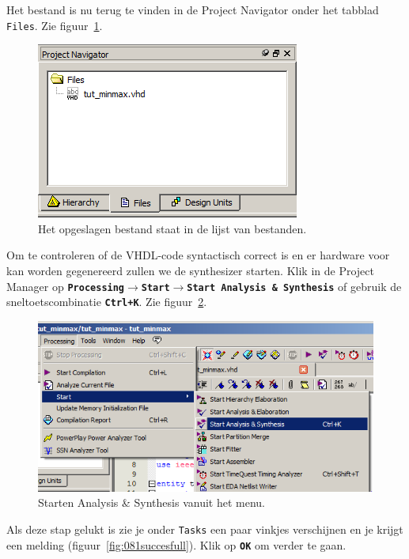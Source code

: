 \documentclass[a4paper,12pt,fleqn,twoside]{book}
\def\tutpicscale{0.455}
\newcommand{\menu}[1]{\texttt{\textbf{#1}}}
\newcommand{\knop}[1]{\texttt{\textbf{#1}}}
\newcommand{\naam}[1]{\texttt{#1}}
\def\pijl{$\rightarrow$}%
\begin{document}
Het bestand is nu terug te vinden in de Project Navigator onder het tabblad
\naam{Files}. Zie figuur~\ref{fig:047fileinfilestab}.
 
\begin{figure}[H]
\centering
\includegraphics[scale=\tutpicscale]{047fileinfilestab.png}
\caption{Het opgeslagen bestand staat in de lijst van bestanden.}
\label{fig:047fileinfilestab}
\end{figure}

Om te controleren of de VHDL-code syntactisch correct is en er hardware voor
kan worden gegenereerd zullen we de synthesizer starten. Klik in de Project
Manager op \menu{Processing\pijl{}Start\pijl{}Start Analysis \& Synthesis} of
gebruik de sneltoetscombinatie \menu{Ctrl+K}. Zie
figuur~\ref{fig:080startanalysisandsynthesis}.
 
\begin{figure}[H]
\centering
\includegraphics[scale=\tutpicscale]{080startanalysisandsynthesis.png}
\caption{Starten Analysis \& Synthesis vanuit het menu.}
\label{fig:080startanalysisandsynthesis}
\end{figure}

Als deze stap gelukt is zie je onder \naam{Tasks} een paar vinkjes verschijnen
en je krijgt een melding (figuur~\ref{fig:081succesfull}). Klik op \knop{OK} om
verder te gaan.
 
\end{document}
